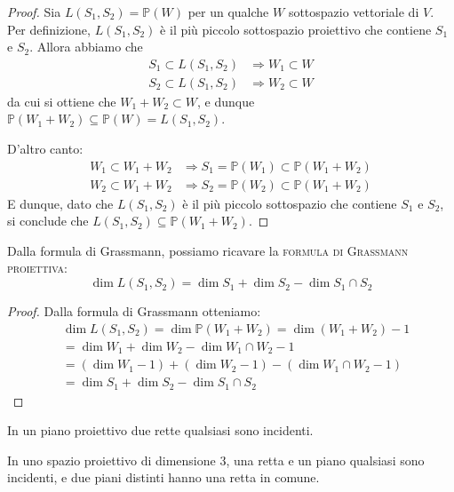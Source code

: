 \begin{proof}
Sia $L(S_1,S_2)=\mathbb{P}(W)$ per un qualche $W$ sottospazio vettoriale di $V$. Per definizione, $L(S_1,S_2)$ è il più piccolo sottospazio proiettivo che contiene $S_1$ e $S_2$. Allora abbiamo che
\begin{align*}
S_1 \subset L(S_1,S_2) &\Rightarrow W_1 \subset W\\
S_2 \subset L(S_1,S_2) &\Rightarrow W_2 \subset W
\end{align*}
da cui si ottiene che $W_1+W_2\subset W$, e dunque $\mathbb{P}(W_1+W_2)\subseteq \mathbb{P}(W)=L(S_1,S_2)$.

D'altro canto:
\begin{align*}
W_1 \subset W_1+W_2 &\Rightarrow S_1=\mathbb{P}(W_1) \subset \mathbb{P}(W_1+W_2)\\
W_2 \subset W_1+W_2 &\Rightarrow S_2=\mathbb{P}(W_2) \subset \mathbb{P}(W_1+W_2)
\end{align*}
E dunque, dato che $L(S_1,S_2)$ è il più piccolo sottospazio che contiene $S_1$ e $S_2$, si conclude che $L(S_1,S_2)\subseteq \mathbb{P}(W_1+W_2)$.
\end{proof}

\begin{defn}
Dalla formula di Grassmann, possiamo ricavare la \textsc{formula di Grassmann proiettiva}:
$$\dim L(S_1,S_2)=\dim S_1+\dim S_2-\dim S_1 \cap S_2$$
\end{defn}

\begin{proof}
Dalla formula di Grassmann otteniamo:
\begin{align*}
&\dim L(S_1,S_2)=\dim \mathbb{P}(W_1+W_2)=\dim (W_1+W_2)-1\\
&=\dim W_1+\dim W_2-\dim W_1 \cap W_2 -1\\
&=(\dim W_1 -1)+(\dim W_2 -1)-(\dim W_1 \cap W_2 -1)\\
&=\dim S_1+\dim S_2-\dim S_1 \cap S_2
\end{align*}
\end{proof}

\begin{prop}
\begin{nlist}
\item In un piano proiettivo due rette qualsiasi sono incidenti.
\item In uno spazio proiettivo di dimensione $3$, una retta e un piano qualsiasi sono incidenti, e due piani distinti hanno una retta in comune.
\end{nlist}
\end{prop}

